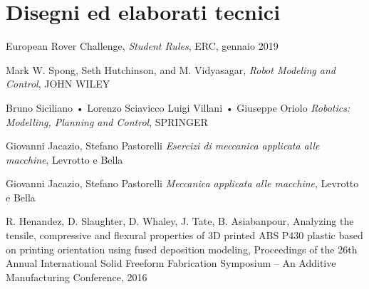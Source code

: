 \documentclass[%
corpo=11pt,
twoside,
 stile=classica,
oldstyle,
greek,%
]{toptesi}
\begin{document}
\backmatter
\chapter{Disegni ed elaborati tecnici}









\begin{thebibliography}{9}
 European Rover Challenge, \emph{Student Rules}, ERC, gennaio 2019

Mark W. Spong, Seth Hutchinson, and M. Vidyasagar, \emph{Robot Modeling and Control}, JOHN WILEY  

Bruno Siciliano • Lorenzo Sciavicco Luigi Villani • Giuseppe Oriolo \emph{Robotics: Modelling, Planning and Control}, SPRINGER

Giovanni Jacazio, Stefano Pastorelli \emph{Esercizi di meccanica applicata alle macchine}, Levrotto e Bella

Giovanni Jacazio, Stefano Pastorelli \emph{Meccanica applicata alle macchine}, Levrotto e Bella

 R. Henandez, D. Slaughter, D. Whaley, J. Tate, B. Asiabanpour, Analyzing the tensile, compressive and flexural properties of 3D printed ABS P430 plastic based on printing orientation using fused deposition modeling, Proceedings of the 26th Annual International Solid Freeform Fabrication Symposium – An Additive Manufacturing Conference, 2016
\end{thebibliography}
\end{document}
